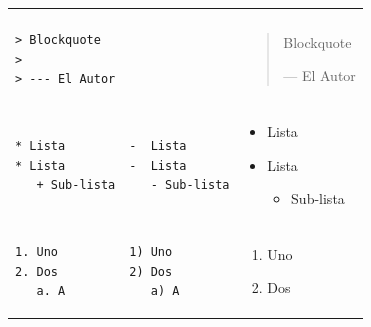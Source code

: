\documentclass[]{book}
\providecommand{\tightlist}{%
  \setlength{\itemsep}{0pt}\setlength{\parskip}{0pt}}
\theoremstyle{definition}
\theoremstyle{definition}
\theoremstyle{definition}
\theoremstyle{remark}
\begin{document}
\begin{longtable}[]{@{}lll@{}}
\begin{minipage}[t]{0.32\columnwidth}
\end{minipage}\tabularnewline
\begin{minipage}[t]{0.32\columnwidth}\raggedright\strut
\begin{verbatim}
> Blockquote
>
> --- El Autor
\end{verbatim}
\strut
\end{minipage} & \begin{minipage}[t]{0.32\columnwidth}\raggedright\strut
\strut
\end{minipage} & \begin{minipage}[t]{0.32\columnwidth}\raggedright\strut
\begin{quote}
Blockquote

--- El Autor
\end{quote}\strut
\end{minipage}\tabularnewline
\begin{minipage}[t]{0.32\columnwidth}\raggedright\strut
\begin{verbatim}
* Lista
* Lista
   + Sub-lista
\end{verbatim}
\strut
\end{minipage} & \begin{minipage}[t]{0.32\columnwidth}\raggedright\strut
\begin{verbatim}
-  Lista
-  Lista
   - Sub-lista
\end{verbatim}
\strut
\end{minipage} & \begin{minipage}[t]{0.32\columnwidth}\raggedright\strut
\begin{itemize}
\tightlist
\item
  Lista
\item
  Lista

  \begin{itemize}
  \tightlist
  \item
    Sub-lista
  \end{itemize}
\end{itemize}\strut
\end{minipage}\tabularnewline
\begin{minipage}[t]{0.32\columnwidth}\raggedright\strut
\begin{verbatim}
1. Uno
2. Dos
   a. A
\end{verbatim}
\strut
\end{minipage} & \begin{minipage}[t]{0.32\columnwidth}\raggedright\strut
\begin{verbatim}
1) Uno
2) Dos
   a) A
\end{verbatim}
\strut
\end{minipage} & \begin{minipage}[t]{0.32\columnwidth}\raggedright\strut
\begin{enumerate}
\def\labelenumi{\arabic{enumi}.}
\tightlist
\item
  Uno
\item
  Dos


\end{enumerate}
\end{minipage}
\end{longtable}
\end{document}
